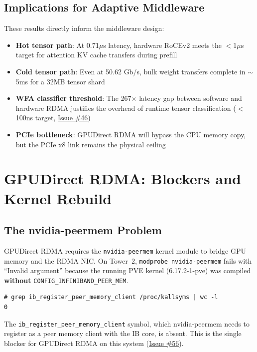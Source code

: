 \documentclass[10pt,letterpaper]{article}
\begin{document}
\subsection{Implications for Adaptive Middleware}

These results directly inform the middleware design:

\begin{itemize}[noitemsep]
    \item \textbf{Hot tensor path}: At 0.71$\mu$s latency, hardware RoCEv2 meets the $<$1$\mu$s target for attention KV cache transfers during prefill
    \item \textbf{Cold tensor path}: Even at 50.62 Gb/s, bulk weight transfers complete in $\sim$5ms for a 32MB tensor shard
    \item \textbf{WFA classifier threshold}: The 267$\times$ latency gap between software and hardware RDMA justifies the overhead of runtime tensor classification ($<$100ns target, \href{https://github.com/ndg8743/ScuffedRDMA/issues/46}{Issue \#46})
    \item \textbf{PCIe bottleneck}: GPUDirect RDMA will bypass the CPU memory copy, but the PCIe x8 link remains the physical ceiling
\end{itemize}

\section{GPUDirect RDMA: Blockers and Kernel Rebuild}

\subsection{The nvidia-peermem Problem}

GPUDirect RDMA requires the \texttt{nvidia-peermem} kernel module to bridge GPU memory and the RDMA NIC. On Tower~2, \texttt{modprobe nvidia-peermem} fails with ``Invalid argument'' because the running PVE kernel (6.17.2-1-pve) was compiled \textbf{without} \texttt{CONFIG\_INFINIBAND\_PEER\_MEM}.

\begin{verbatim}
# grep ib_register_peer_memory_client /proc/kallsyms | wc -l
0
\end{verbatim}

The \texttt{ib\_register\_peer\_memory\_client} symbol, which nvidia-peermem needs to register as a peer memory client with the IB core, is absent. This is the single blocker for GPUDirect RDMA on this system (\href{https://github.com/ndg8743/ScuffedRDMA/issues/56}{Issue \#56}).
\end{document}
